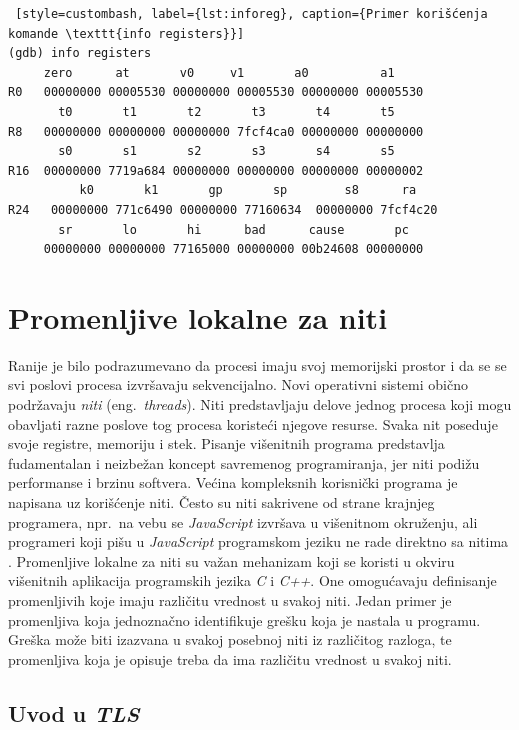 \documentclass[12pt,oneside]{memoir}
\begin{document}
\begin{lstlisting} [style=custombash, label={lst:inforeg}, caption={Primer korišćenja komande \texttt{info registers}}]
(gdb) info registers 
	 zero      at       v0     v1       a0	        a1       
R0   00000000 00005530 00000000 00005530 00000000 00005530
       t0       t1       t2       t3       t4       t5       
R8   00000000 00000000 00000000 7fcf4ca0 00000000 00000000
       s0       s1       s2       s3       s4       s5       
R16  00000000 7719a684 00000000 00000000 00000000 00000002
          k0       k1       gp       sp        s8      ra
R24   00000000 771c6490 00000000 77160634  00000000 7fcf4c20
       sr       lo       hi      bad      cause       pc
     00000000 00000000 77165000 00000000 00b24608 00000000
\end{lstlisting}

\chapter{Promenljive lokalne za niti}
\label{chp:TLS}

Ranije je bilo podrazumevano da procesi imaju svoj memorijski prostor i da se se svi poslovi procesa izvršavaju sekvencijalno. Novi operativni sistemi obično podržavaju \emph{niti} (eng.~\emph{threads}). Niti predstavljaju delove jednog procesa koji mogu obavljati razne poslove tog procesa koristeći njegove resurse. Svaka nit poseduje svoje registre, memoriju i stek. Pisanje višenitnih programa predstavlja fudamentalan i neizbežan koncept savremenog programiranja, jer niti podižu performanse i brzinu softvera. Većina kompleksnih korisnički programa je napisana uz korišćenje niti. Često su niti sakrivene od strane krajnjeg programera, npr.~na vebu se \emph{JavaScript} izvršava u višenitnom okruženju, ali programeri koji pišu u \emph{JavaScript} programskom jeziku ne rade direktno sa nitima \cite{JavaScript}. Promenljive lokalne za niti su važan mehanizam koji se koristi u okviru višenitnih aplikacija programskih jezika \emph{C} i \emph{C++}. One omogućavaju definisanje promenljivih koje imaju različitu vrednost u svakoj niti. Jedan primer je promenljiva koja jednoznačno identifikuje grešku koja je nastala u programu. Greška može biti izazvana u svakoj posebnoj niti iz različitog razloga, te promenljiva koja je opisuje treba da ima različitu vrednost u svakoj niti.

\section{Uvod u \emph{TLS}}
\end{document}
